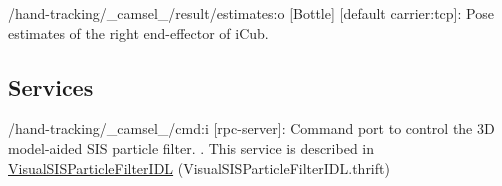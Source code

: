 \begin{DoxyItemize}
\item /hand-\/tracking/\+\_\+camsel\+\_\+/result/estimates\+:o \mbox{[}Bottle\mbox{]} \mbox{[}default carrier\+:tcp\mbox{]}\+: Pose estimates of the right end-\/effector of i\+Cub.
\end{DoxyItemize}\hypertarget{group__visualservoingserver_services_sec}{}\subsection{Services}\label{group__visualservoingserver_services_sec}

\begin{DoxyItemize}
\item /hand-\/tracking/\+\_\+camsel\+\_\+/cmd\+:i \mbox{[}rpc-\/server\mbox{]}\+: Command port to control the 3D model-\/aided S\+IS particle filter. . This service is described in \hyperlink{classVisualSISParticleFilterIDL}{Visual\+S\+I\+S\+Particle\+Filter\+I\+DL} (Visual\+S\+I\+S\+Particle\+Filter\+I\+D\+L.\+thrift) 
\end{DoxyItemize}